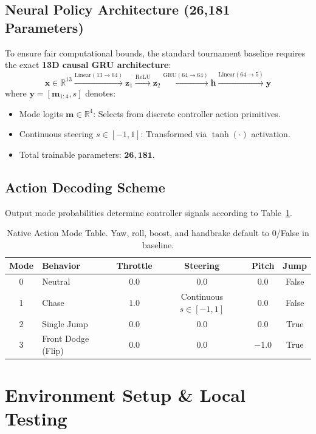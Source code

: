 \documentclass[11pt,a4paper]{article}
\begin{document}
\subsection{Neural Policy Architecture (26,181 Parameters)}
To ensure fair computational bounds, the standard tournament baseline requires the exact \textbf{13D causal GRU architecture}:
\begin{equation*}
    \mathbf{x} \in \mathbb{R}^{13} \xrightarrow{\text{Linear}(13 \to 64)} \mathbf{z}_1 \xrightarrow{\text{ReLU}} \mathbf{z}_2 \xrightarrow{\text{GRU}(64 \to 64)} \mathbf{h} \xrightarrow{\text{Linear}(64 \to 5)} \mathbf{y}
\end{equation*}
where $\mathbf{y} = [\mathbf{m}_{1:4}, s]$ denotes:
\begin{itemize}[noitemsep]
    \item Mode logits $\mathbf{m} \in \mathbb{R}^4$: Selects from discrete controller action primitives.
    \item Continuous steering $s \in [-1, 1]$: Transformed via $\tanh(\cdot)$ activation.
    \item Total trainable parameters: $\mathbf{26,181}$.
\end{itemize}

\subsection{Action Decoding Scheme}
Output mode probabilities determine controller signals according to Table~\ref{tab:action_decoding}.

\begin{table}[h!]
\centering
\small
\begin{tabular}{clcccc}
\toprule
\textbf{Mode} & \textbf{Behavior} & \textbf{Throttle} & \textbf{Steering} & \textbf{Pitch} & \textbf{Jump} \\
\midrule
0 & Neutral & $0.0$ & $0.0$ & $0.0$ & False \\
1 & Chase & $1.0$ & Continuous $s \in [-1, 1]$ & $0.0$ & False \\
2 & Single Jump & $0.0$ & $0.0$ & $0.0$ & True \\
3 & Front Dodge (Flip) & $0.0$ & $0.0$ & $-1.0$ & True \\
\bottomrule
\end{tabular}
\caption{Native Action Mode Table. Yaw, roll, boost, and handbrake default to 0/False in baseline.}
\label{tab:action_decoding}
\end{table}

\section{Environment Setup \& Local Testing}
\end{document}
